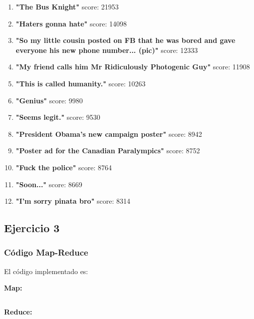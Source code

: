\begin{enumerate}

\item \textbf{"The Bus Knight"} score: 21953
\item \textbf{"Haters gonna hate"} score: 14098
\item  \textbf{"So my little cousin posted on FB that he was bored and gave everyone his new phone number... (pic)"} score: 12333
\item \textbf{"My friend calls him Mr Ridiculously Photogenic Guy"} score: 11908
\item \textbf{"This is called humanity."} score: 10263
\item \textbf{"Genius"} score: 9980
\item \textbf{"Seems legit."} score: 9530
\item \textbf{"President Obama's new campaign poster"} score: 8942
\item\textbf{"Poster ad for the Canadian Paralympics"} score: 8752
\item \textbf{"Fuck the police"} score: 8764
\item \textbf{"Soon..."} score: 8669
\item \textbf{"I'm sorry pinata bro"} score: 8314

\end{enumerate}

\subsection{Ejercicio 3}


\subsubsection{C\'odigo Map-Reduce}

El c\'odigo implementado es:

\textbf{Map:}

\begin{lstlisting}

\end{lstlisting}


\vspace{2mm}

\textbf{Reduce:}

\begin{lstlisting}

\end{lstlisting}


\vspace{2mm}

